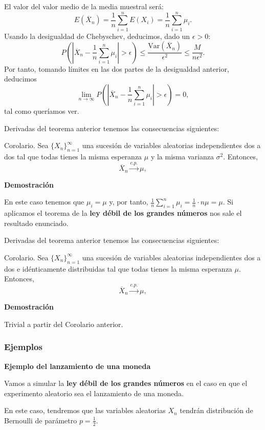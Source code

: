 \documentclass[]{book}
\begin{document}
El valor del valor medio de la media muestral será:
\[
E(\overline{X}_n)=\frac{1}{n}\sum_{i=1}^n E(X_i)=\frac{1}{n}\sum_{i=1}^n \mu_i. 
\]
Usando la desigualdad de Chebyschev, deducimos, dado un \(\epsilon >0\):
\[
P\left(\left|\overline{X}_n-\frac{1}{n}\sum_{i=1}^n \mu_i\right|>\epsilon\right) \leq \frac{\mathrm{Var}(\overline{X}_n)}{\epsilon^2}\leq \frac{M}{n\epsilon^2}.
\]
Por tanto, tomando límites en las dos partes de la desigualdad anterior, deducimos
\[
\lim_{n\to \infty}P\left(\left|\overline{X}_n-\frac{1}{n}\sum_{i=1}^n \mu_i\right|>\epsilon\right) =0,
\]
tal como queríamos ver.

Derivadas del teorema anterior tenemos las consecuencias siguientes:

Corolario.
Sea \(\{X_n\}_{n=1}^\infty\) una sucesión de variables aleatorias independientes dos a dos tal que todas tienes la misma esperanza \(\mu\) y la misma varianza \(\sigma^2\). Entonces,
\[
\overline{X}_n\stackrel{c.p.}{\longrightarrow} \mu,
\]

\textbf{Demostración}

En este caso tenemos que \(\mu_i=\mu\) y, por tanto, \(\frac{1}{n}\sum\limits_{i=1}^n \mu_i =\frac{1}{n}\cdot n\mu=\mu\). Si aplicamos el teorema de la \textbf{ley débil de los grandes números} nos sale el resultado enunciado.

Derivadas del teorema anterior tenemos las consecuencias siguientes:

Corolario.
Sea \(\{X_n\}_{n=1}^\infty\) una sucesión de variables aleatorias independientes dos a dos e idénticamente distribuidas tal que todas tienes la misma esperanza \(\mu\). Entonces,
\[
\overline{X}_n\stackrel{c.p.}{\longrightarrow} \mu,
\]

\textbf{Demostración}

Trivial a partir del Corolario anterior.

\hypertarget{ejemplos-18}{%
\subsubsection{Ejemplos}\label{ejemplos-18}}

\textbf{Ejemplo del lanzamiento de una moneda}

Vamos a simular la \textbf{ley débil de los grandes números} en el caso en que el experimento aleatorio sea el lanzamiento de una moneda.

En este caso, tendremos que las variables aleatorias \(X_n\) tendrán distribución de Bernoulli de parámetro \(p=\frac{1}{2}\).
\end{document}
